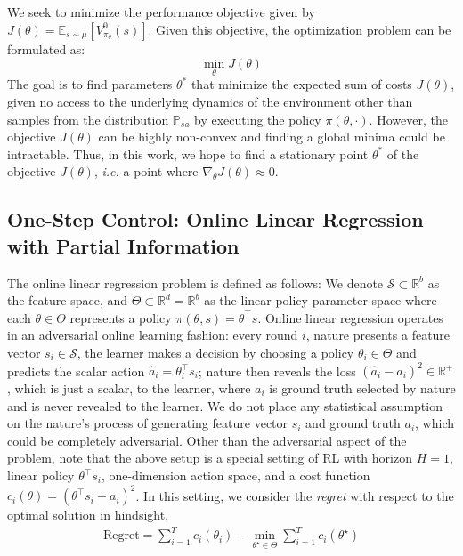 We seek to minimize
the performance objective given by $J(\theta) = \mathbb{E}_{s \sim
  \mu}[V^0_{\pi_\theta}(s)]$. Given this
objective, the optimization problem  can be formulated
as:
\begin{equation}
  \label{eq:1}
  \min_\theta J(\theta)
\end{equation}
The goal is to find parameters $\theta^*$ that minimize the
expected sum of costs $J(\theta)$, given no access to the underlying dynamics
of the environment other than samples from the distribution
$\mathbb{P}_{sa}$ by executing the policy $\pi(\theta,
\cdot)$. However, the objective $J(\theta)$ can be highly non-convex
and finding a global minima could be intractable. Thus, in this work, we hope to find a stationary point
$\theta^*$ of the objective $J(\theta)$, \textit{i.e.} a point where
$\nabla_\theta J(\theta) \approx 0$.

 
%


\subsection{One-Step Control: Online Linear Regression with Partial Information}
\label{sec:define_OLR}
The online linear regression problem is defined as follows: We denote
$\mathcal{S}\subset\mathbb{R}^{b}$ as the feature space, and $\Theta
\subset\mathbb{R}^{d} = \mathbb{R}^b$ as the linear policy parameter space where each
$\theta\in\Theta$ represents a policy $\pi(\theta, s) =
\theta^{\top}s$. Online linear regression operates in an adversarial
online learning fashion: every round $i$, nature presents a
feature vector $s_i\in\mathcal{S}$, the learner makes a decision by
choosing a policy $\theta_{i}\in\Theta$ and predicts the scalar action
$\hat{a}_i = \theta_i^{\top}s_i$; nature then reveals the loss
$(\hat{a}_i - a_i)^2 \in\mathbb{R}^+$, which is just a scalar, to the
learner, where $a_i$ is ground truth selected by nature and is
never revealed to the learner.  We do not place any statistical
assumption on the nature's process of generating feature vector $s_i$
and ground truth $a_i$, which could be completely adversarial. Other
than the adversarial aspect of the problem, note that the above setup
is a special setting of RL with horizon $H=1$, linear policy
$\theta^{\top}s_i$, one-dimension action space, and a cost function
$c_i(\theta) = (\theta^{\top}s_i - a_i)^2$. In this setting, we
consider the \textit{regret} with respect to the optimal solution in hindsight,
\begin{align}
    \mathrm{Regret} = \sum_{i=1}^{T} c_i(\theta_i) - \min_{\theta^\star\in\Theta} \sum_{i=1}^T c_i(\theta^\star)
\end{align}
%

